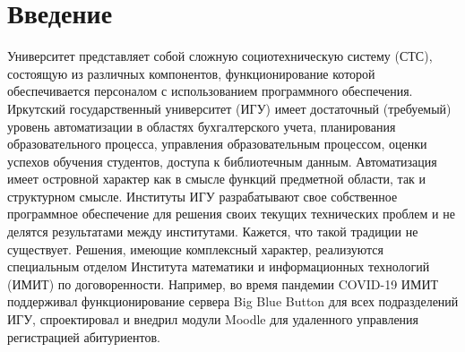 \documentclass[
]{aiitart}
\begin{document}
\maketitle

\section{Введение}

Университет представляет собой сложную социотехническую систему (СТС), \cite{zh2020} состоящую из различных компонентов, функционирование которой обеспечивается персоналом с использованием программного обеспечения. Иркутский государственный университет (ИГУ) имеет достаточный (требуемый) уровень автоматизации в областях бухгалтерского учета, планирования образовательного процесса, управления образовательным процессом, оценки успехов обучения студентов, доступа к библиотечным данным. Автоматизация имеет островной характер как в смысле функций предметной области, так и структурном смысле. Институты ИГУ разрабатывают свое собственное программное обеспечение для решения своих текущих технических проблем и не делятся результатами между институтами. Кажется, что такой традиции не существует. Решения, имеющие комплексный характер, реализуются специальным отделом Института математики и информационных технологий (ИМИТ) по договоренности. Например, во время пандемии COVID-19 ИМИТ поддерживал функционирование сервера Big Blue Button для всех подразделений ИГУ, спроектировал и внедрил модули Moodle для удаленного управления регистрацией абитуриентов.
\end{document}

